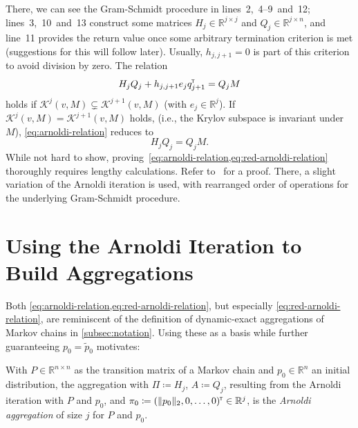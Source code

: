 \documentclass[runningheads]{llncs}
\newcommand*{\bbR}{\mathbb{R}}
\newcommand*{\transp}{^{\mkern-1.5mu{\scriptscriptstyle\mathsf{T}}}}
\DeclarePairedDelimiter{\norm}{\lVert}{\rVert}
\begin{document}
There, we can see the Gram-Schmidt procedure in lines~2,~4--9~and~12; lines~3,~10~and~13 construct some matrices $H_j \in \bbR^{j \times j}$ and $Q_j \in \bbR^{j \times n}$, and line~11 provides the return value once some arbitrary termination criterion is met (suggestions for this will follow later).
Usually, $h_{j, j + 1} = 0$ is part of this criterion to avoid division by zero.
The relation
\begin{equation}\label{eq:arnoldi-relation}
H_j Q_j + h_{j, j + 1} e_j q_{j + 1}\transp = Q_j M
\end{equation}
holds if $\mathcal{K}^j(v, M) \subsetneq \mathcal{K}^{j + 1}(v, M)$ (with $e_j \in \bbR^j$).
If $\mathcal{K}^j(v, M) = \mathcal{K}^{j + 1}(v, M)$ holds, (i.e., the Krylov subspace is invariant under $M$), \cref{eq:arnoldi-relation} reduces to
\begin{equation}\label{eq:red-arnoldi-relation}
H_j Q_j = Q_j M.
\end{equation}
While not hard to show, proving~\cref{eq:arnoldi-relation,eq:red-arnoldi-relation} thoroughly requires lengthy calculations.
Refer to~\cite[Sec.~6.2]{saad2011numericalmethods} for a proof.
There, a slight variation of the Arnoldi iteration is used, with rearranged order of operations for the underlying Gram-Schmidt procedure.

\section{Using the Arnoldi Iteration to Build Aggregations}\label{sec:building-aggregations}
Both \cref{eq:arnoldi-relation,eq:red-arnoldi-relation}, but especially \cref{eq:red-arnoldi-relation}, are reminiscent of the definition of dynamic-exact aggregations of Markov chains in \cref{subsec:notation}.
Using these as a basis while further guaranteeing $p_0 = \tilde{p}_0$ motivates:
\begin{definition}\label{def:arnoldi-aggregation}
With $P \in \bbR^{n \times n}$ as the transition matrix of a Markov chain and $p_0 \in \bbR^n$ an initial distribution, the aggregation with $\Pi \coloneqq H_j$, $A \coloneqq Q_j$, resulting from the Arnoldi iteration with $P$ and $p_0$, and
$
    \pi_0 \coloneqq (\norm{p_0}_2, 0, \dots, 0)\transp \in \bbR^j
$,
is the \emph{Arnoldi aggregation} of size $j$ for $P$ and $p_0$.
\end{definition}
\end{document}
